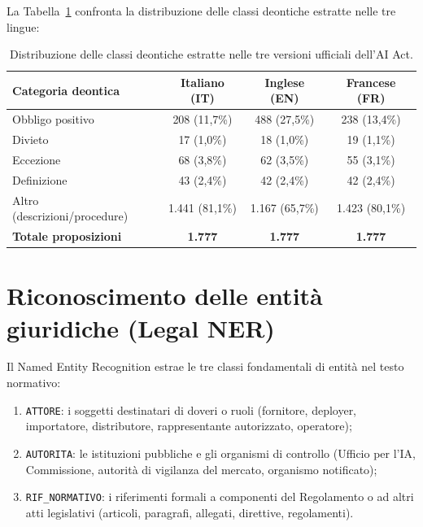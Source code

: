 \documentclass[12pt,a4paper,oneside]{report}
\begin{document}
La Tabella~\ref{tab:distribuzione_deontica} confronta la distribuzione delle classi deontiche estratte nelle tre lingue:

\begin{table}[H]
    \centering
    \small
    \renewcommand{\arraystretch}{1.3}
    \begin{tabular}{l c c c}
        \toprule
        \textbf{Categoria deontica} & \textbf{Italiano (IT)} & \textbf{Inglese (EN)} & \textbf{Francese (FR)} \\
        \midrule
        Obbligo positivo & 208 (11,7\%) & 488 (27,5\%) & 238 (13,4\%) \\
        Divieto & 17 (1,0\%) & 18 (1,0\%) & 19 (1,1\%) \\
        Eccezione & 68 (3,8\%) & 62 (3,5\%) & 55 (3,1\%) \\
        Definizione & 43 (2,4\%) & 42 (2,4\%) & 42 (2,4\%) \\
        Altro (descrizioni/procedure) & 1.441 (81,1\%) & 1.167 (65,7\%) & 1.423 (80,1\%) \\
        \midrule
        \textbf{Totale proposizioni} & \textbf{1.777} & \textbf{1.777} & \textbf{1.777} \\
        \bottomrule
    \end{tabular}
    \caption[Distribuzione comparativa delle classi deontiche]{Distribuzione delle classi deontiche estratte nelle tre versioni ufficiali dell'AI Act.}
    \label{tab:distribuzione_deontica}
\end{table}

\section{Riconoscimento delle entità giuridiche (Legal NER)}
\label{sec:ner_metodologia}

Il Named Entity Recognition estrae le tre classi fondamentali di entità nel testo normativo:
\begin{enumerate}
    \item \texttt{ATTORE}: i soggetti destinatari di doveri o ruoli (fornitore, deployer, importatore, distributore, rappresentante autorizzato, operatore);
    \item \texttt{AUTORITA}: le istituzioni pubbliche e gli organismi di controllo (Ufficio per l'IA, Commissione, autorità di vigilanza del mercato, organismo notificato);
    \item \texttt{RIF\_NORMATIVO}: i riferimenti formali a componenti del Regolamento o ad altri atti legislativi (articoli, paragrafi, allegati, direttive, regolamenti).
\end{enumerate}
\end{document}
